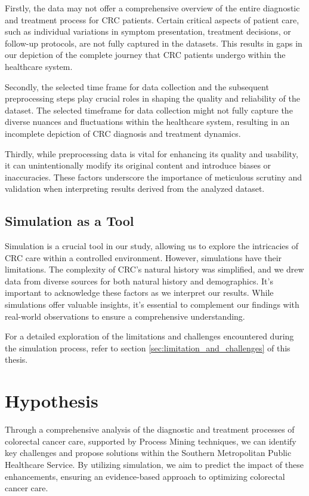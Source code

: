 Firstly, the data may not offer a comprehensive overview of the entire diagnostic and treatment process for CRC patients. Certain critical aspects of patient care, such as individual variations in symptom presentation, treatment decisions, or follow-up protocols, are not fully captured in the datasets. This results in gaps in our depiction of the complete journey that CRC patients undergo within the healthcare system.

Secondly, the selected time frame for data collection and the subsequent preprocessing steps play crucial roles in shaping the quality and reliability of the dataset. The selected timeframe for data collection might not fully capture the diverse nuances and fluctuations within the healthcare system, resulting in an incomplete depiction of CRC diagnosis and treatment dynamics. 

Thirdly, while preprocessing data is vital for enhancing its quality and usability, it can unintentionally modify its original content and introduce biases or inaccuracies. These factors underscore the importance of meticulous scrutiny and validation when interpreting results derived from the analyzed dataset.

\subsection*{Simulation as a Tool}

Simulation is a crucial tool in our study, allowing us to explore the intricacies of CRC care within a controlled environment. However, simulations have their limitations. The complexity of CRC's natural history was simplified, and we drew data from diverse sources for both natural history and demographics. It's important to acknowledge these factors as we interpret our results. While simulations offer valuable insights, it's essential to complement our findings with real-world observations to ensure a comprehensive understanding.

For a detailed exploration of the limitations and challenges encountered during the simulation process, refer to section \ref{sec:limitation_and_challenges} of this thesis.

\section{Hypothesis}

Through a comprehensive analysis of the diagnostic and treatment processes of colorectal cancer care, supported by Process Mining techniques, we can identify key challenges and propose solutions within the Southern Metropolitan Public Healthcare Service. By utilizing simulation, we aim to predict the impact of these enhancements, ensuring an evidence-based approach to optimizing colorectal cancer care.

